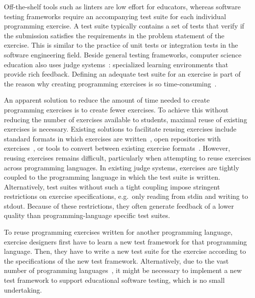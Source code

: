 \documentclass[../main]{subfiles}
\begin{document}
Off-the-shelf tools such as linters are low effort for educators, whereas software testing frameworks require an accompanying test suite for each individual programming exercise.
A test suite typically contains a set of tests that verify if the submission satisfies the requirements in the problem statement of the exercise.
This is similar to the practice of unit tests or integration tests in the software engineering field.
Beside general testing frameworks, computer science education also uses judge systems~\autocite{paiva_automated_2022, wasik_survey_2018}: specialized learning environments that provide rich feedback.
Defining an adequate test suite for an exercise is part of the reason why creating programming exercises is so time-consuming~\autocite{zavala_use_2018, staubitz_towards_2017, queiros_pexil_2011, pirttinen_crowdsourcing_2018, gulwani_feedback_2014, tang_data-driven_2016}.

An apparent solution to reduce the amount of time needed to create programming exercises is to create fewer exercises.
To achieve this without reducing the number of exercises available to students, maximal reuse of existing exercises is necessary.
Existing solutions to facilitate reusing exercises include standard formats in which exercises are written~\autocite{paiva_yet_2020, verhoeff_programming_2008}, open repositories with exercises~\autocite{staubitz_towards_2017}, or tools to convert between existing exercise formats~\autocite{queiros_babeloextensible_2013}.
However, reusing exercises remains difficult, particularly when attempting to reuse exercises across programming languages.
In existing judge systems, exercises are tightly coupled to the programming language in which the test suite is written.
Alternatively, test suites without such a tight coupling impose stringent restrictions on exercise specifications, e.g.\ only reading from stdin and writing to stdout.
Because of these restrictions, they often generate feedback of a lower quality than programming-language specific test suites.

To reuse programming exercises written for another programming language, exercise designers first have to learn a new test framework for that programming language.
Then, they have to write a new test suite for the exercise according to the specifications of the new test framework.
Alternatively, due to the vast number of programming languages~\autocite{bissyande_popularity_2013}, it might be necessary to implement a new test framework to support educational software testing, which is no small undertaking.
\end{document}
